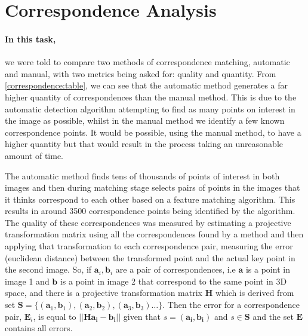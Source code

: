 \section{Correspondence Analysis}

\paragraph{In this task,} we were told to compare two methods of correspondence matching, automatic and manual, with two metrics being asked for: quality and quantity. From \autoref{correspondence:table}, we can see that the automatic method generates a far higher quantity of correspondences than the manual method. This is due to the automatic detection algorithm attempting to find as many points on interest in the image as possible, whilst in the manual method we identify a few known correspondence points. It would be possible, using the manual method, to have a higher quantity but that would result in the process taking an unreasonable amount of time. 

The automatic method finds tens of thousands of points of interest in both images and then during matching stage selects pairs of points in the images that it thinks correspond to each other based on a feature matching algorithm. This results in around 3500 correspondence points being identified by the algorithm. The quality of these correspondences was measured by estimating a projective transformation matrix using all the correspondences found by a method and then applying that transformation to each correspondence pair, measuring the error (euclidean distance) between the transformed point and the actual key point in the second image. So, if $\mathbf{a}_i, \mathbf{b}_i$ are a pair of correspondences, i.e $\mathbf{a}$ is a point in image 1 and $\mathbf{b}$ is a point in image 2 that correspond to the same point in 3D space, and there is a projective transformation matrix $\mathbf{H}$ which is derived from set $\mathbf{S} = \{(\mathbf{a}_1, \mathbf{b}_1), (\mathbf{a}_2, \mathbf{b}_2), (\mathbf{a}_3, \mathbf{b}_3) \dots\} $. Then the error for a correspondence pair, $\mathbf{E}_i$, is equal to $||\mathbf{Ha_i} - \mathbf{b_i}|| $ given that $ s = (\mathbf{a_i}, \mathbf{b_i}) $ and $ s \in \mathbf{S}$ and the set $\mathbf{E}$ contains all errors.

